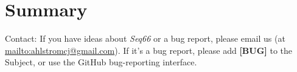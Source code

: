 \documentclass[
 11pt,
 twoside,
 a4paper,
 final                                 %
]{article}
\begin{document}








\section{Summary}
\label{sec:summary}

   Contact: If you have ideas about \textsl{Seq66} or a bug report,
   please email us (at \url{mailto:ahlstromcj@gmail.com}).
   If it's a bug report, please add \textbf{[BUG]} to the Subject, or use the
   GitHub bug-reporting interface.




\printindex
\end{document}
